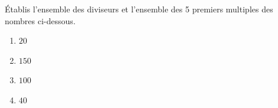 %
%
	Établis l'ensemble des diviseurs et l'ensemble des 5 premiers multiples des nombres ci-dessous.
	\begin{enumerate}[cols=4]
		\item $20$
		\item $150$
		\item $100$
		\item $40$
	\end{enumerate}
